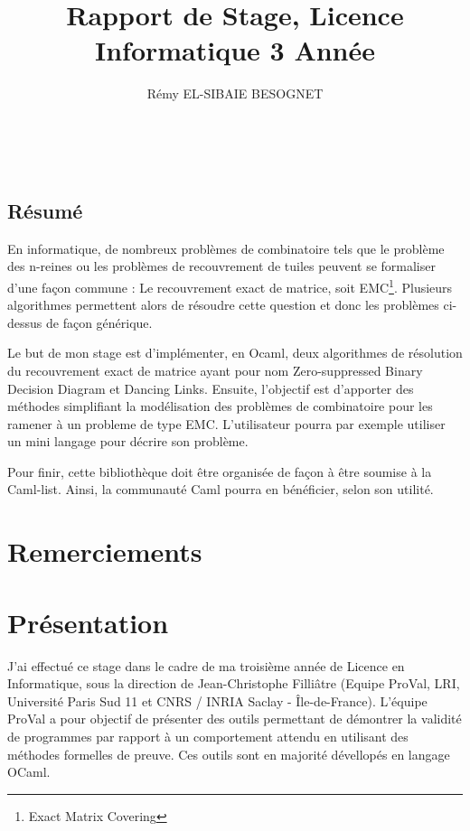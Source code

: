 \documentclass[a4paper]{article}
\title{Rapport de Stage, Licence Informatique 3\up{ème} Année}
\author{Rémy \textsc{EL-SIBAIE BESOGNET}}
\begin{document}


~
\vfill

\begin{center}
\section*{Résumé}
\end{center}
En informatique, de nombreux problèmes de combinatoire tels que le problème des 
n-reines ou les problèmes de recouvrement de tuiles peuvent se formaliser d'une
façon commune :
Le recouvrement exact de matrice, soit EMC\footnote{Exact Matrix Covering}. 
Plusieurs algorithmes permettent alors 
de résoudre cette question et donc les problèmes ci-dessus de façon générique.

Le but de mon stage est d'implémenter, en Ocaml, deux algorithmes de
résolution du recouvrement exact de matrice ayant pour nom 
Zero-suppressed Binary Decision
Diagram et Dancing Links. 
Ensuite, l'objectif est d'apporter des méthodes 
simplifiant la modélisation des problèmes de combinatoire pour les ramener
à un probleme de type EMC. L'utilisateur pourra par 
exemple utiliser un mini langage pour décrire son problème.

Pour finir, cette bibliothèque doit être organisée de façon à être soumise à la 
Caml-list. Ainsi, la communauté Caml pourra en bénéficier, selon son utilité.

\vfill




\newpage
\section*{Remerciements}

\newpage
\tableofcontents
\newpage
\listoffigures

\newpage
\section{Présentation}


J'ai effectué ce stage dans le cadre de ma troisième année de Licence en 
Informatique, sous la direction de Jean-Christophe Filliâtre (Equipe ProVal, 
LRI, Université Paris Sud 11 et CNRS / INRIA Saclay - Île-de-France). L'équipe 
ProVal a pour objectif de présenter des outils permettant de démontrer la 
validité de programmes par rapport à un comportement attendu en utilisant des
méthodes formelles de preuve.
Ces outils sont en majorité dévellopés en langage OCaml. 
\end{document}
